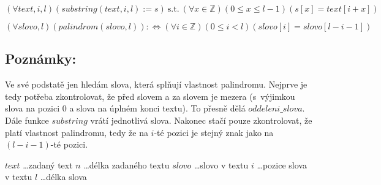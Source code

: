 \documentclass{article}
\newcommand{\Z}{\mathbb{Z}}
\begin{document}
$$(\forall text,i,l)(substring(text,i,l):=s)\ \text{s.t.}\ (\forall x \in \Z)(0 \leq x \leq l-1)(s[x]=text[i+x])$$\newline

$$(\forall slovo,l)(palindrom(slovo,l)): \Leftrightarrow (\forall i \in \Z)(0 \leq i < l)(slovo[i]=slovo[l-i-1])$$

\subsection{Poznámky:}
Ve své podstatě jen hledám slova, která splňují vlastnost palindromu. Nejprve je tedy potřeba zkontrolovat, že před slovem a za slovem je mezera (s~výjimkou slova na pozici 0 a slova na úplném konci textu). To přesně dělá $oddeleni\_slova$. Dále funkce $substring$ vrátí jednotlivá slova. Nakonec stačí pouze zkontrolovat, že platí vlastnost palindromu, tedy že na $i$-té pozici je stejný znak jako na $(l-i-1)$-té pozici.\newline
\begin{flushleft}
$text$ \dots zadaný text \newline
$n$ \dots délka zadaného textu \newline
$slovo$ \dots slovo v textu \newline
$i$ \dots pozice slova v textu \newline
$l$ \dots délka slova \newline\newline
\end{flushleft}
\end{document}

